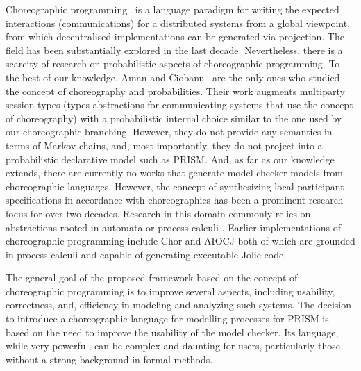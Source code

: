 %
  Choreographic programming~\cite{M23} is a
language paradigm for writing the expected interactions
(communications) for a distributed systems from a global viewpoint,
from which decentralised implementations can be generated via
projection. The field has been substantially explored in the last
decade. Nevertheless, there is a scarcity of research on probabilistic
aspects of choreographic programming.
%
To the best of our knowledge, Aman and Ciobanu~\cite{AC19,AC22} are
the only ones who studied the concept of choreography and
probabilities. Their work augments multiparty session types (types
abstractions for communicating systems that use the concept of
choreography) with a probabilistic internal choice similar to the one
used by our choreographic branching. However, they do not provide any
semantics in terms of Markov chains, and, most importantly, they do
not project into a probabilistic declarative model such as PRISM.
%
And, as far as our knowledge extends, there are currently no works
that generate model checker models from choreographic languages.
However, the concept of synthesizing local participant specifications
in accordance with choreographies has been a prominent research focus
for over two decades. Research in this domain commonly relies on
abstractions rooted in automata or process calculi
\cite{DBLP:conf/popl/HondaYC08,DBLP:journals/scp/AutiliIT18}.  Earlier
implementations of choreographic programming include Chor
\cite{DBLP:conf/popl/CarboneM13} and AIOCJ
\cite{DBLP:journals/corr/PredaGGLM16} both of which are grounded in
process calculi and capable of generating executable Jolie code.



%
The general goal of the proposed framework based on the concept of
choreographic programming is to improve several aspects, including
usability, correctness, and, efficiency in modeling and analyzing such
systems.
%
The decision to introduce a choreographic language for modelling
processes for PRISM is based on the need to improve the usability of
the model checker. Its language, while very powerful, can be complex
and daunting for users, particularly those without a strong background
in formal methods.

